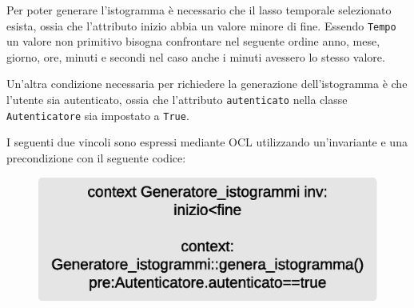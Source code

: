 Per poter generare l'istogramma è necessario che il lasso temporale selezionato esista, ossia che l'attributo inizio abbia un valore minore di fine. Essendo  \texttt{Tempo} un valore non primitivo bisogna confrontare nel seguente ordine anno, mese, giorno, ore, minuti e secondi nel caso anche i minuti avessero lo stesso valore.

Un'altra condizione necessaria per richiedere la generazione dell'istogramma è che l'utente sia autenticato, ossia che l'attributo \texttt{autenticato} nella classe \texttt{Autenticatore} sia impostato a \texttt{True}.

I seguenti due vincoli sono espressi mediante OCL utilizzando un'invariante e una precondizione con il seguente codice:

\begin{figure}[ht]
    \centering
    \includegraphics[scale=0.5]{Img/OCLGeneratoreIstogrammi.eps}
\end{figure}